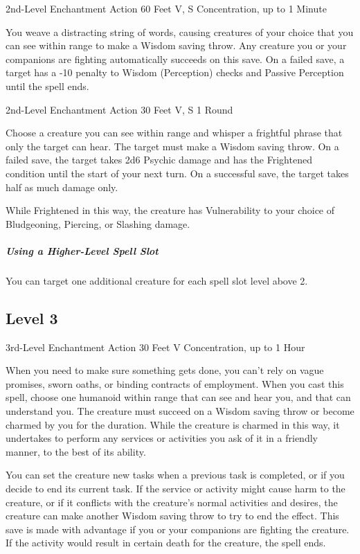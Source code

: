\documentclass[letterpaper,openany,oneside,twocolumn]{book}
\begin{document}
	{2nd-Level Enchantment}
	{Action}
	{60 Feet}
	{V, S}
	{Concentration, up to 1 Minute}

You weave a distracting string of words, causing creatures of your choice that you can see within range to make a Wisdom saving throw. Any creature you or your companions are fighting automatically succeeds on this save. On a failed save, a target has a -10 penalty to Wisdom (Perception) checks and Passive Perception until the spell ends.

	{2nd-Level Enchantment}
	{Action}
	{30 Feet}
	{V, S}
	{1 Round}

Choose a creature you can see within range and whisper a frightful phrase that only the target can hear. The target must make a Wisdom saving throw. On a failed save, the target takes 2d6 Psychic damage and has the Frightened condition until the start of your next turn. On a successful save, the target takes half as much damage only.

While Frightened in this way, the creature has Vulnerability to your choice of Bludgeoning, Piercing, or Slashing damage.

\subparagraph*{Using a Higher-Level Spell Slot} You can target one additional creature for each spell slot level above 2.

\subsection*{Level 3}

	{3rd-Level Enchantment}
	{Action}
	{30 Feet}
	{V}
	{Concentration, up to 1 Hour}

When you need to make sure something gets done, you can't rely on vague promises, sworn oaths, or binding contracts of employment. When you cast this spell, choose one humanoid within range that can see and hear you, and that can understand you. The creature must succeed on a Wisdom saving throw or become charmed by you for the duration. While the creature is charmed in this way, it undertakes to perform any services or activities you ask of it in a friendly manner, to the best of its ability.

You can set the creature new tasks when a previous task is completed, or if you decide to end its current task. If the service or activity might cause harm to the creature, or if it conflicts with the creature's normal activities and desires, the creature can make another Wisdom saving throw to try to end the effect. This save is made with advantage if you or your companions are fighting the creature. If the activity would result in certain death for the creature, the spell ends.
\end{document}
